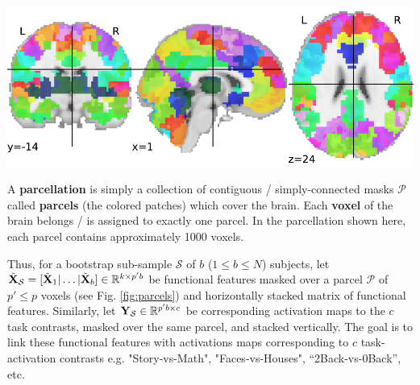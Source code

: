 \begin{marginfigure}
  \includegraphics[width=1\linewidth]{figures/parcellation_00.pdf}
  \caption{A \textbf{parcellation} is simply a collection of contiguous /
    simply-connected masks $\mathcal P$ called \textbf{parcels} (the colored patches)
    which cover the brain. Each \textbf{voxel} of the brain belongs / is assigned to exactly one
    parcel. In the parcellation shown here, each parcel contains approximately 1000 voxels.}
  \label{fig:parcels}
\end{marginfigure}

Thus, for a bootstrap sub-sample $\mathcal S$ of $b$ ($1 \le b \le N$)
subjects, let $\tilde{\mathbf{X}}_{\mathcal S} = [\tilde{\mathbf{X}}_1|\ldots|\tilde{\mathbf{X}}_b] \in
\mathbb R^{k \times p'b}$ be functional features masked over a parcel $\mathcal
P$ of $p' \le p$ voxels (see Fig. \ref{fig:parcels}) and horizontally stacked
matrix of functional features. Similarly, let $\mathbf{Y}_{\mathcal S} \in \mathbb
R^{p'b \times c}$ be corresponding activation maps to the $c$ task contrasts,
masked over the same parcel, and stacked vertically. The goal is to link these
functional features with activations maps corresponding to $c$ task-activation
contrasts e.g. "Story-vs-Math", "Faces-vs-Houses", ``2Back-vs-0Back'', etc.


